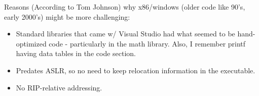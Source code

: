 \documentclass[]{llncs}
\begin{document}
Reasons (According to Tom Johnson) why x86/windows (older code like
90's, early 2000's) might be more challenging:
\begin{itemize}
\item Standard libraries that came w/ Visual Studio had what seemed to
  be hand-optimized code - particularly in the math library. Also, I
  remember printf having data tables in the code section.
\item Predates ASLR, so no need to keep relocation information in the
  executable.
\item No RIP-relative addressing. 
\end{itemize}




\end{document}
